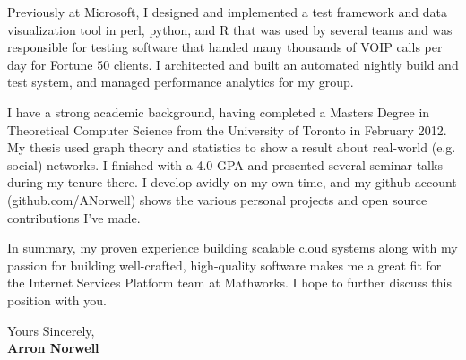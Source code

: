\documentclass[11pt]{article}
\begin{document}
Previously at Microsoft, I designed and implemented a test framework and data visualization tool in perl, python, and R that was used by several teams and was responsible for testing software that handed many thousands of VOIP calls per day for Fortune 50 clients. I architected and built an automated nightly build and test system, and managed performance analytics for my group.

I have a strong academic background, having completed a Masters Degree in Theoretical Computer Science from the University of Toronto in February 2012. My thesis used graph theory and statistics to show a result about real-world (e.g. social) networks. I finished with a 4.0 GPA and presented several seminar talks during my tenure there. I develop avidly on my own time, and my github account (github.com/ANorwell) shows the various personal projects and open source contributions I’ve made.

In summary, my proven experience building scalable cloud systems along with my passion for building well-crafted, high-quality software makes me a great fit for the Internet Services Platform team at Mathworks. I hope to further discuss this position with you.

Yours Sincerely,\\[2em] %
%
{\bfseries Arron Norwell}\\
%
\end{document}
